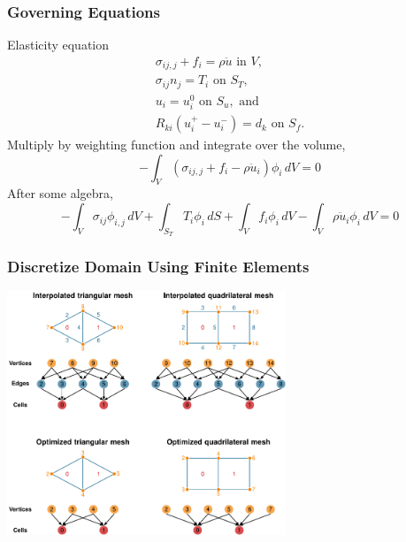 \documentclass{beamer}
\begin{document}
\begin{frame}
  \frametitle{Governing Equations}
  \summary{}

  \vfill
  Elasticity equation
  \begin{gather}
    \sigma_{ij,j} + f_i = \rho \ddot{u} \text{ in } V, \\
    \sigma_{ij} n_j = T_i \text{ on } S_T, \\
    u_i = u_i^0 \text{ on } S_u, \text{ and } \\
    R_{ki}(u^{+}_i - u^{-}_i) = d_k \text{ on } S_f.
  \end{gather}
  Multiply by weighting function and integrate over the volume,
  \begin{equation}
    -\int_V (\sigma_{ij,j} + f_i - \rho \ddot{u}_i) \phi_i \, dV = 0
  \end{equation}
  After some algebra,
  \begin{equation}
    -\int_V \sigma_{ij} \phi_{i,j} \, dV 
    + \int_{S_T} T_i \phi_i\, dS
    + \int_V f_i \phi_i \, dV 
    - \int_V \rho \ddot{u}_i \phi_i \, dV = 0
  \end{equation}
  \vfill
  
\end{frame}


\begin{frame}
  \frametitle{Discretize Domain Using Finite Elements}
 
   \begin{center}
     \includegraphics[height=7.3cm]{figs/meshtopology}
   \end{center}
   
 \end{frame}
 
\end{document}
